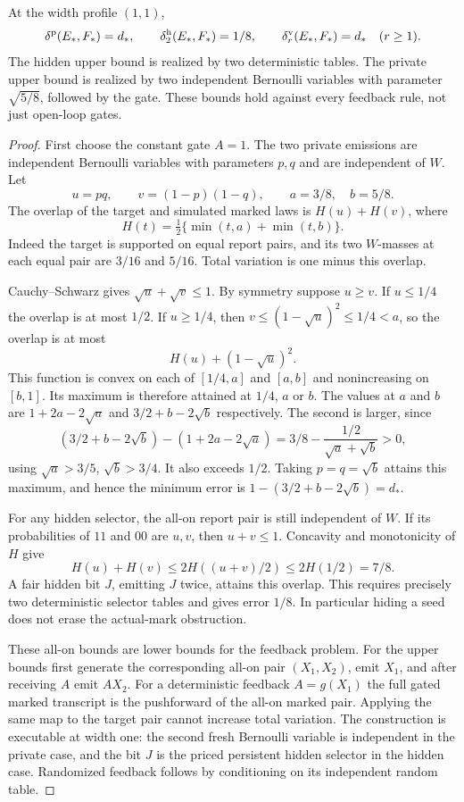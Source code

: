 \begin{theorem}
\label{thm:v17-markedgap}
At the width profile $(1,1)$,
\begin{equation}\label{eq:v17-markedgap}
 \delta^{\rm p}(E_*,F_*)=d_*,\qquad
 \delta^{\rm h}_{2}(E_*,F_*)=1/8,\qquad
 \delta^{\rm v}_{r}(E_*,F_*)=d_*\quad(r\ge1).
\end{equation}
The hidden upper bound is realized by two deterministic tables.
The private upper bound is realized by two independent Bernoulli
variables with parameter $\sqrt{5/8}$, followed by the gate. These
bounds hold against every feedback rule, not just open-loop gates.
\end{theorem}
\begin{proof}
First choose the constant gate $A=1$. The two private emissions are
independent Bernoulli variables with parameters $p,q$ and are
independent of $W$. Let
\[
 u=pq,\qquad v=(1-p)(1-q),\qquad a=3/8,\quad b=5/8.
\]
The overlap of the target and simulated marked laws is
$H(u)+H(v)$, where
\[
 H(t)=\tfrac12\{\min(t,a)+\min(t,b)\}.
\]
Indeed the target is supported on equal report pairs, and its two
$W$-masses at each equal pair are $3/16$ and $5/16$. Total variation
is one minus this overlap.

Cauchy--Schwarz gives $\sqrt u+\sqrt v\le1$. By symmetry suppose
$u\ge v$. If $u\le1/4$ the overlap is at most $1/2$. If $u\ge1/4$,
then $v\le(1-\sqrt u)^2\le1/4<a$, so the overlap is at most
\[
 H(u)+(1-\sqrt u)^2.
\]
This function is convex on each of $[1/4,a]$ and $[a,b]$ and
nonincreasing on $[b,1]$. Its maximum is therefore attained at
$1/4$, $a$ or $b$. The values at $a$ and $b$ are
$1+2a-2\sqrt a$ and $3/2+b-2\sqrt b$ respectively. The second is
larger, since
\[
 (3/2+b-2\sqrt b)-(1+2a-2\sqrt a)
 =3/8-\frac{1/2}{\sqrt a+\sqrt b}>0,
\]
using $\sqrt a>3/5$, $\sqrt b>3/4$. It also exceeds $1/2$.
Taking $p=q=\sqrt b$ attains this maximum, and hence the minimum
error is $1-(3/2+b-2\sqrt b)=d_*$.

For any hidden selector, the all-on report pair is still independent
of $W$. If its probabilities of $11$ and $00$ are $u,v$, then
$u+v\le1$. Concavity and monotonicity of $H$ give
\[
 H(u)+H(v)\le2H((u+v)/2)\le2H(1/2)=7/8.
\]
A fair hidden bit $J$, emitting $J$ twice, attains this overlap.
This requires precisely two deterministic selector tables and gives
error $1/8$. In particular hiding a seed does not erase the actual-mark
obstruction.

These all-on bounds are lower bounds for the feedback problem. For
the upper bounds first generate the corresponding all-on pair
$(X_1,X_2)$, emit $X_1$, and after receiving $A$ emit $AX_2$.
For a deterministic feedback $A=g(X_1)$ the full gated marked
transcript is the pushforward of the all-on marked pair. Applying the
same map to the target pair cannot increase total variation. The
construction is executable at width one: the second fresh Bernoulli
variable is independent in the private case, and the bit $J$ is the
priced persistent hidden selector in the hidden case. Randomized
feedback follows by conditioning on its independent random table.


\end{proof}
